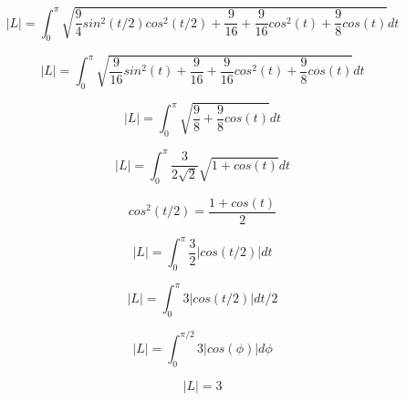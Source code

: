 \documentclass{article}
\begin{document}
\begin{equation*}
    |L| = \int_{0}^{\pi} \sqrt{\frac{9}{4} sin^2(t/2) cos^2(t/2)+\frac{9}{16}+\frac{9}{16}cos^2(t)+\frac{9}{8}cos(t)}dt
\end{equation*}

\begin{equation*}
    |L| = \int_{0}^{\pi} \sqrt{\frac{9}{16} sin^2(t)+\frac{9}{16}+\frac{9}{16}cos^2(t)+\frac{9}{8}cos(t)}dt
\end{equation*}

\begin{equation*}
    |L| = \int_{0}^{\pi} \sqrt{\frac{9}{8}+\frac{9}{8}cos(t)}dt
\end{equation*}

\begin{equation*}
    |L| = \int_{0}^{\pi} \frac{3}{2\sqrt{2}} \sqrt{1+cos(t)}dt
\end{equation*}

\begin{equation*}
    cos^2(t/2) = \frac{1+cos(t)}{2}
\end{equation*}

\begin{equation*}
    |L| = \int_{0}^{\pi} \frac{3}{2} | cos(t/2) | dt
\end{equation*}

\begin{equation*}
    |L| = \int_{0}^{\pi} 3 | cos(t/2) | dt/2
\end{equation*}

\begin{equation*}
    |L| = \int_{0}^{\pi/2} 3 | cos(\phi) | d\phi
\end{equation*}

\begin{equation}
    |L| = 3
\end{equation}


\newpage
\end{document}
